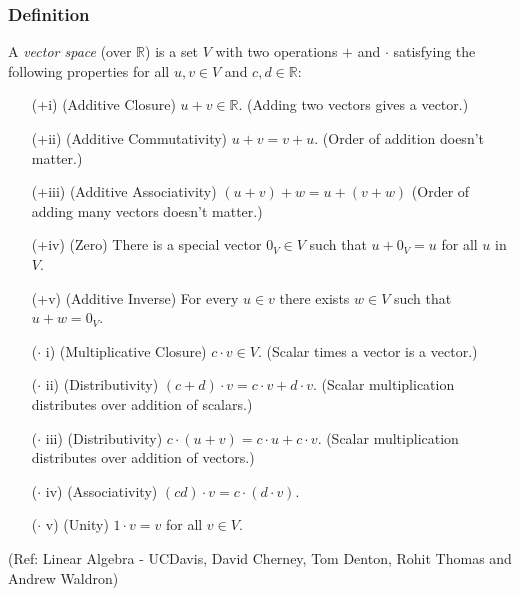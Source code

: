 \begin{frame}[fragile]
\frametitle{Definition}

\begin{definition} A \emph{vector space} (over $\mathbb{R}$) is a set $V$ with two operations $+$ and $\cdot$ satisfying the following properties for all $u, v \in V$ and $c, d \in \mathbb{R}$:

\begin{itemize}

\item[(+i)] (Additive Closure) $u+v \in \mathbb{R}$.  (Adding two vectors gives a vector.)

\item[(+ii)] (Additive Commutativity) $u+v=v+u$.  (Order of addition doesn't matter.)

\item[(+iii)] (Additive Associativity) $(u+v)+w = u+(v+w)$  (Order of adding many vectors doesn't matter.)

\item[(+iv)] (Zero) There is a special vector $0_V \in V$ such that $u+0_V = u$ for all $u$ in $V$.

\item[(+v)] (Additive Inverse) For every $u \in v$ there exists $w \in V$ such that $u+w=0_V$.

\item[($\cdot$ i)] (Multiplicative Closure) $c\cdot v \in V$.  (Scalar times a vector is a vector.)

\item[($\cdot$ ii)] (Distributivity) $(c+d) \cdot v= c\cdot v + d\cdot v$.  (Scalar multiplication distributes over addition of scalars.)

\item[($\cdot$ iii)] (Distributivity) $c\cdot (u+v)= c\cdot u + c\cdot v$.  (Scalar multiplication distributes over addition of vectors.) 

\item[($\cdot$ iv)] (Associativity) $ (cd)\cdot v = c \cdot (d \cdot v)$. 

\item[($\cdot$ v)] (Unity) $1\cdot v = v$ for all $v \in V$.
\end{itemize}
\end{definition}

\tiny{(Ref: Linear Algebra - UCDavis, David Cherney, Tom Denton, Rohit Thomas and Andrew Waldron)}

\end{frame}

